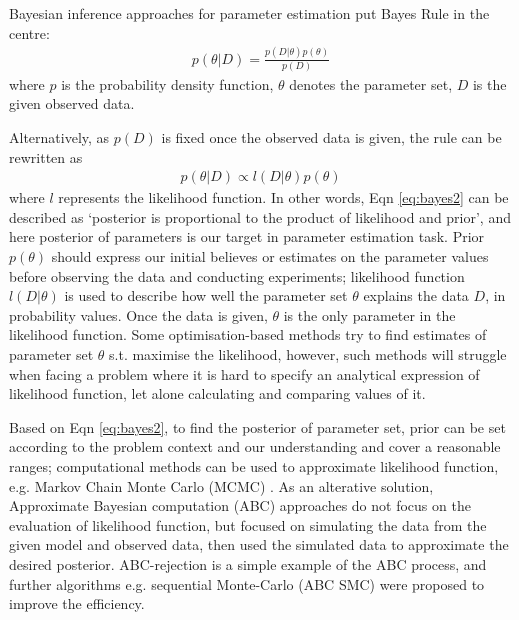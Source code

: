 



 Bayesian inference approaches for parameter estimation put Bayes Rule in the centre:
 \begin{align}
    \label{eq:bayes}
    p(\theta|D) = \frac{p(D|\theta)p(\theta)}{p(D)}
\end{align}
where $p$ is the probability density function, $\theta$ denotes the parameter set, $D$ is the given observed data.

Alternatively, as $p(D)$ is fixed once the observed data is given, the rule can be rewritten as 
\begin{align}
    \label{eq:bayes2}
    p(\theta|D) \propto l(D|\theta)p(\theta)
\end{align}
where $l$ represents the likelihood function. In other words, Eqn \ref{eq:bayes2} can be described as `posterior is proportional to the product of likelihood and prior', and here posterior of parameters is our target in parameter estimation task. Prior $p(\theta)$ should express our initial believes or estimates on the parameter values before observing the data and conducting experiments; likelihood function $l(D|\theta)$ is used to describe how well the parameter set $\theta$ explains the data $D$, in probability values. Once the data is given, $\theta$ is the only parameter in the likelihood function. Some optimisation-based methods try to find estimates of parameter set $\theta$ s.t. maximise the likelihood, however, such methods will struggle when facing a problem where it is hard to specify an analytical expression of likelihood function, let alone calculating and comparing values of it.

Based on Eqn \ref{eq:bayes2}, to find the posterior of parameter set, prior can be set according to the problem context and our understanding and cover a reasonable ranges; computational methods can be used to approximate likelihood function, e.g. Markov Chain Monte Carlo (MCMC) \cite{ref:MCMC}. As an alterative solution, Approximate Bayesian computation (ABC) approaches do not focus on the evaluation of likelihood function, but focused on simulating the data from the given model and observed data, then used the simulated data to approximate the desired posterior. ABC-rejection \cite{ABC_rejection} is a simple example of the ABC process, and further algorithms e.g. sequential Monte-Carlo (ABC SMC)\cite{Toni} were proposed to improve the efficiency.


